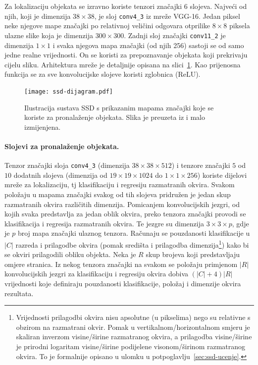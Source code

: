 \documentclass[utf8, seminar, numeric, lmodern]{feri}
\begin{document}
Za lokalizaciju objekata se izravno koriste tenzori značajki $6$ slojeva. Najveći od njih, koji je dimenzija $38\times 38$, je sloj \texttt{conv4\_3} iz mreže VGG-16. Jedan piksel neke njegove mape značajki po relativnoj veličini odgovara otprilike $8\times8$ piksela ulazne slike koja je dimenzija $300\times 300$. Zadnji sloj značajki \texttt{conv11\_2} je dimenzija $1\times 1$ i svaka njegova mapa značajki (od njih 256) sastoji se od samo jedne realne vrijednosti. On se koristi za prepoznavanje objekata koji prekrivaju cijelu sliku. Arhitektura mreže je detaljnije opisana na slici~\ref{fig:ssd-arh}. Kao prijenosna funkcija se za sve konvolucijske slojeve koristi zglobnica ($\mathrm{ReLU}$).

\begin{figure}[htbp] \centering
	\texttt{[image: ssd-dijagram.pdf]}
	\caption{Ilustracija sustava SSD s prikazanim mapama značajki koje se koriste za pronalaženje objekata. Slika je preuzeta iz \cite{ssd} i malo izmijenjena.}
	\label{fig:ssd-arh}
\end{figure}

\paragraph{Slojevi za pronalaženje objekata.}
Tenzor značajki sloja \texttt{conv4\_3} (dimenzija $38\times 38\times 512$) i tenzore značajki $5$ od $10$ dodatnih slojeva (dimenzija od $19\times 19\times 1024$ do $1\times 1\times 256$) koriste dijelovi mreže za lokalizaciju, tj klasifikaciju i regresiju razmatranih okvira. Svakom položaju u mapama značajki svakog od tih slojeva pridružen je jedan skup razmatranih okvira različitih dimenzija.
Pomicanjem konvolucijskih jezgri, od kojih svaka predstavlja za jedan oblik okvira, preko tenzora značajki provodi se klasifikacija i regresija razmatranih okvira. Te jezgre su dimenzija $3\times 3\times p$, gdje je $p$ broj mapa značajki ulaznog tenzora. Računaju se pouzdanosti klasifikacije u $\left|C\right|$ razreda i prilagodbe okvira (pomak središta i prilagodba dimenzija\footnote{Vrijednosti prilagodbi okvira nisu apsolutne (u pikselima) nego su relativne s obzirom na razmatrani okvir. Pomak u vertikalnom/horizontalnom smjeru je skaliran inverzom visine/širine razmatranog okvira, a prilagodba visine/širine je prirodni logaritam visine/širine podijelene visonom/širinom razmatranog okvira. To je formalnije opisano u ulomku  u potpoglavlju~\ref{sec:ssd-ucenje}.}) kako bi se okviri prilagodili obliku objekta.
Neka je $R$ skup brojeva koji predstavljaju omjere stranica. Iz nekog tenzora značajki na svakom se položaju primjenom $|R|$ konvolucijskih jezgri za klasifikaciju i regresiju okvira dobiva $(|C|+4)\left|R\right|$ vrijednosti koje definiraju pouzdanosti klasifikacije, položaj i dimenzije okvira rezultata.
\end{document}
